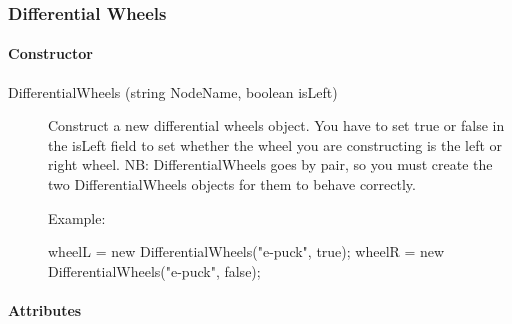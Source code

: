 \subsubsection{Differential Wheels}

\paragraph{Constructor}

\noindent
\begin{description}
\item[{DifferentialWheels (string NodeName, boolean isLeft)}]
  Construct a new differential wheels object. You have to set true or
  false in the isLeft field to set whether the wheel you are
  constructing is the left or right wheel.  NB: DifferentialWheels
  goes by pair, so you must create the two DifferentialWheels objects
  for them to behave correctly.

  Example:

\begin{urbifixme}
wheelL = new DifferentialWheels("e-puck", true);
wheelR = new DifferentialWheels("e-puck", false);
\end{urbifixme}
\end{description}

\paragraph{Attributes}


